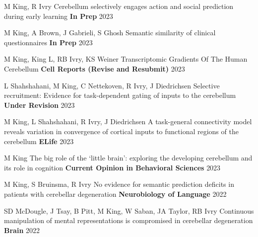 


\begin{cventries}

  \cventry
    {M King, R Ivry} %
    {Cerebellum selectively engages action and social prediction during early learning} %
    {\textbf{In Prep}} %
    {2023} %
    {}

  \cventry
    {M King, A Brown, J Gabrieli, S Ghosh} %
    {Semantic similarity of clinical questionnaires} %
    {\textbf{In Prep}} %
    {2023} %
    {}

  \cventry
    {M King, King L, RB Ivry, KS Weiner} %
    {Transcriptomic Gradients Of The Human Cerebellum} %
    {\textbf{Cell Reports (Revise and Resubmit)}} %
    {2023} %
    {}

\cventry
    {L Shahshahani, M King, C Nettekoven, R Ivry, J Diedrichsen} %
    {Selective recruitment: Evidence for task-dependent gating of inputs to the cerebellum} %
    {\textbf{Under Revision}} %
    {2023} %
    {}
    
  \cventry
    {M King, L Shahshahani, R Ivry, J Diedrichsen} %
    {A task-general connectivity model reveals variation in convergence of cortical inputs to functional regions of the cerebellum} %
    {\textbf{ELife}} %
    {2023} %
    {}

  \cventry
    {M King} %
    {The big role of the ‘little brain’: exploring the developing cerebellum and its role in cognition} %
    {\textbf{Current Opinion in Behavioral Sciences}} %
    {2023} %
    {}

  \cventry
    {M King, S Bruinsma, R Ivry} %
    {No evidence for semantic prediction deficits in patients with cerebellar degeneration} %
    {\textbf{Neurobiology of Language}} %
    {2022} %
    {}

  \cventry
    {SD McDougle, J Tsay, B Pitt, M King, W Saban, JA Taylor, RB Ivry} %
    {Continuous manipulation of mental representations is compromised in cerebellar degeneration} %
    {\textbf{Brain}} %
    {2022} %
    {}
    

\end{cventries}
